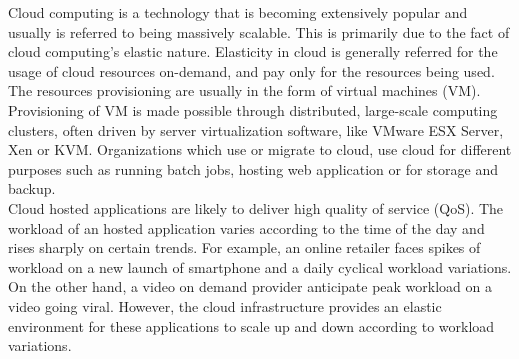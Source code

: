 

Cloud computing\cite{mell2011nist} is a technology that is becoming extensively popular and usually is referred to being massively scalable. This is primarily due to the fact of cloud computing's elastic nature. Elasticity in cloud is generally referred for the usage of cloud resources on-demand\cite{mell2011nist}, and pay only for the resources being used. The resources provisioning are usually in the form of virtual machines (VM). Provisioning of VM is made possible through distributed, large-scale computing clusters, often driven by server virtualization software, like VMware ESX Server\cite{vmwareesx}, Xen\cite{xenhyper} or KVM\cite{kvmhyper}. Organizations which use or migrate to cloud, use cloud for different purposes such as running batch jobs, hosting web application or for storage and backup.
\\
Cloud hosted applications are likely to deliver high quality of service (QoS). The workload of an hosted application varies according to the time of the day and rises sharply on certain trends. For example, an online retailer faces spikes of workload on a new launch of smartphone and a daily cyclical workload variations\cite{dawoud2013scalability}. On the other hand, a video on demand provider anticipate peak workload on a video going viral\cite{niu2012quality}. However, the cloud infrastructure provides an elastic environment for these applications to scale up and down according to workload variations.

